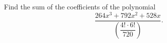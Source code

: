 Find the sum of the coefficients of the polynomial
\[
\dfrac{264x^3+792x^2+528x}{\left(\dfrac{4!\cdot6!}{720}\right)}.
\]
